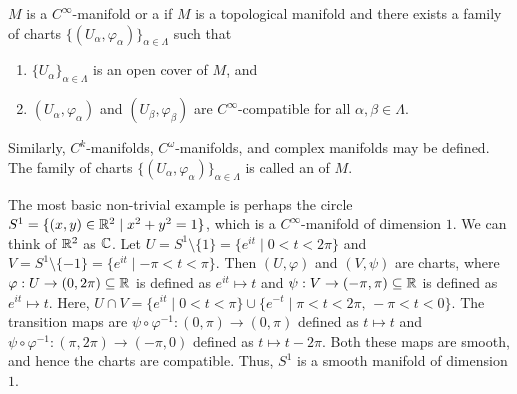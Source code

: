 \begin{definition}
    $M$ is a $C^{\infty}$-manifold or a  if $M$ is a topological manifold and there exists a family of charts $\{(U_{\alpha},\varphi_{\alpha})\}_{\alpha \in \Lambda}$ such that
    \begin{enumerate}
        \item $\{U_{\alpha}\}_{\alpha \in \Lambda}$ is an open cover of $M$, and
        \item $(U_{\alpha},\varphi_{\alpha})$ and $(U_{\beta},\varphi_{\beta})$ are $C^{\infty}$-compatible for all $\alpha,\beta \in \Lambda$.
    \end{enumerate}
    Similarly, $C^{k}$-manifolds, $C^{\omega}$-manifolds, and complex manifolds may be defined. The family of charts $\{(U_{\alpha},\varphi_{\alpha})\}_{\alpha \in \Lambda}$ is called an  of $M$.
\end{definition}

The most basic non-trivial example is perhaps the circle $S^{1} = \{(x,y) \in \mathbb{R}^{2} \mid x^{2}+y^{2} = 1\}$, which is a $C^{\infty}$-manifold of dimension $1$. We can think of $\mathbb{R}^{2}$ as $\mathbb{C}$. Let $U = S^{1}\setminus\{1\} = \{e^{it} \mid 0 < t < 2\pi\}$ and $V = S^{1}\setminus\{-1\} = \{e^{it} \mid -\pi < t < \pi\}$. Then $(U,\varphi)$ and $(V,\psi)$ are charts, where $\varphi:U \to (0,2\pi) \subseteq \mathbb{R}$ is defined as $e^{it} \mapsto t$ and $\psi:V \to (-\pi,\pi) \subseteq \mathbb{R}$ is defined as $e^{it} \mapsto t$. Here, $U \cap V = \{e^{it} \mid 0 < t < \pi\} \cup \{e^{-t} \mid \pi < t < 2\pi,\, -\pi < t < 0\}$. The transition maps are $\psi \circ \varphi^{-1}:(0,\pi) \to (0,\pi)$ defined as $t \mapsto t$ and $\psi \circ \varphi^{-1}:(\pi,2\pi) \to (-\pi,0)$ defined as $t \mapsto t-2\pi$. Both these maps are smooth, and hence the charts are compatible. Thus, $S^{1}$ is a smooth manifold of dimension $1$.
\\

